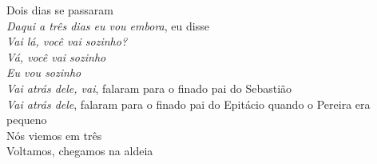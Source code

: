 \begin{linenumbers}\begingroup\raggedright
 
\noindent   Dois dias se passaram\\
  \emph{Daqui a três dias eu vou embora}, eu disse\\
  \emph{Vai lá, você vai sozinho?}\\
  \emph{Vá, você vai sozinho}\\
  \emph{Eu vou sozinho}\\
  \emph{Vai atrás dele, vai}, falaram para o finado pai do Sebastião\\
  \emph{Vai atrás dele}, falaram para o finado pai do Epitácio quando o Pereira era pequeno\\
  Nós viemos em três\\
  Voltamos, chegamos na aldeia
 
\end{linenumbers}\endgroup

\bigskip

